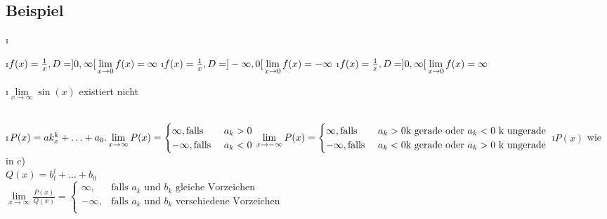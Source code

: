 \subsection{Beispiel}\label{sec:4.17}
\begin{enumerate}[a)]
\i 
\begin{itemize}
\i $f(x) = \frac{1}{x} , D = ]0,\infty[\\
\lim\limits_{x \rightarrow 0} f(x) = \infty$
\i $f(x) = \frac{1}{x}, D = ]-\infty,0[\\
\lim\limits_{x \rightarrow 0} f(x) = -\infty$
\i $f(x) = \frac{1}{x} , D = ]0,\infty[\\
\lim\limits_{x \rightarrow 0} f(x) = \infty$
\end{itemize} 
\i $\lim\limits_{x \rightarrow \infty} \sin(x)$ existiert nicht
\begin{minipage}[c]{\textwidth}
\end{minipage}
\\
\i $P(x) = ak_x^k + \ldots + a_0.\\
\lim\limits_{x \rightarrow \infty} P(x) = \begin{cases}
\infty , \text{falls }& a_k > 0\\
-\infty , \text{falls }& a_k < 0
\end{cases}\\
\lim\limits_{x \rightarrow -\infty} P(x) = 
\begin{cases}
\infty , \text{falls }& a_k > 0 \text{k gerade oder } a_k < 0 \text{ k ungerade}\\
-\infty , \text{falls }& a_k < 0 \text{k gerade oder } a_k > 0 \text{ k ungerade}
\end{cases}$
\i $P(x)$ wie in c)\\
$Q(x) = b_l^l + \ldots + b_0$\\
$\lim\limits_{x \rightarrow \infty} \frac{P(x)}{Q(x)} = 
\begin{cases}
\infty, &\text{falls $a_k$ und $b_k$ gleiche Vorzeichen}\\
-\infty, &\text{falls $a_k$ und $b_k$ verschiedene Vorzeichen}\\
\end{cases}$

\end{enumerate}

